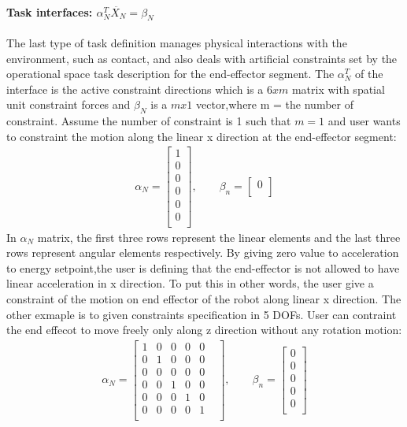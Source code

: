 \documentclass[report.tex]{subfiles}
\begin{document}
    \paragraph*{\large{Task interfaces: $\alpha_N^T \ddot{X_N} = \beta_N$}\\} The last type of task definition manages physical interactions with the environment, such as contact, and also deals with artificial constraints set by the operational space task description for the end-effector segment. The $\alpha_N^T$ of the interface is the active constraint directions which is a $6 x m$ matrix with spatial unit constraint forces and $\beta_N$ is a $m x 1$ vector,where m = the number of constraint.
    Assume the number of constraint is 1 such that $m = 1$ and user wants to constraint the motion along the linear x direction at the end-effector segment:
    \begin{align}
        \alpha_N = \begin{bmatrix}
            1\\
            0\\
            0\\
            0\\
            0\\
            0\\ 
        \end{bmatrix} ,\qquad
        \beta_n = \begin{bmatrix}
            0\\ 
        \end{bmatrix}
    \end{align}
    In $\alpha_N$ matrix, the first three rows represent the linear elements and the last three rows represent angular elements respectively. By giving zero value to acceleration to energy setpoint,the user is defining that the end-effector is not allowed to have linear acceleration in x direction. To put this in other words, the user give a constraint of the motion on end effector of the robot along linear x direction.
    The other exmaple is to given constraints specification in 5 DOFs. User can contraint the end effecot to move freely only along z direction without any rotation motion:   
    \begin{align}
        \alpha_N = \begin{bmatrix}
            1&0&0&0&0&\\
            0&1&0&0&0&\\
            0&0&0&0&0&\\
            0&0&1&0&0&\\
            0&0&0&1&0&\\
            0&0&0&0&1&\\ 
        \end{bmatrix} ,\qquad
        \beta_n = \begin{bmatrix}
            0\\
            0\\
            0\\
            0\\
            0\\ 
        \end{bmatrix}
    \end{align}
\end{document}
